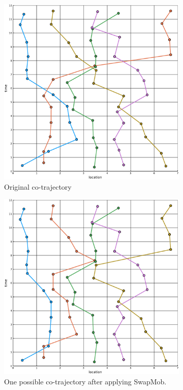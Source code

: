 \documentclass[12pt]{article}
\theoremstyle{definition}
\begin{document}
\begin{figure}
  \centering
  \begin{subfigure}[t]{0.49\textwidth}
    \includegraphics[width=\textwidth]{cotrajectory_example-a.pdf}
    \caption{Original co-trajectory}
    \label{fig:graph-swap-big-example-orig}
  \end{subfigure}
  \begin{subfigure}[t]{0.49\textwidth}
    \includegraphics[width=\textwidth]{cotrajectory_example-b.pdf}
    \caption{One possible co-trajectory after applying SwapMob.}
    \label{fig:graph-swap-big-example-swap}
  \end{subfigure}
  \caption{}
  \label{fig:graph-swap-big-example}
\end{figure}
\end{document}
